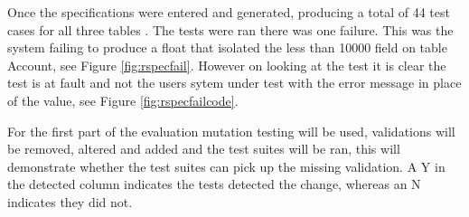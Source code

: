 \documentclass[a4paper,12pt]{article}
\begin{document}
\par Once the specifications were entered and generated, producing a total of 44 test cases for all three tables . The tests were ran there was one failure. This was the system failing to produce a float that isolated the less than 10000 field on table Account, see Figure \ref{fig:rspecfail}. However on looking at the test it is clear the test is at fault and not the users sytem under test with the error message in place of the value, see Figure \ref{fig:rspecfailcode}.
\vspace{3mm}
\par For the first part of the evaluation mutation testing will be used, validations will be removed, altered and added and the test suites will be ran, this will demonstrate whether the test suites can pick up the missing validation. A Y in the detected column indicates the tests detected the change, whereas an N indicates they did not.
\end{document}
